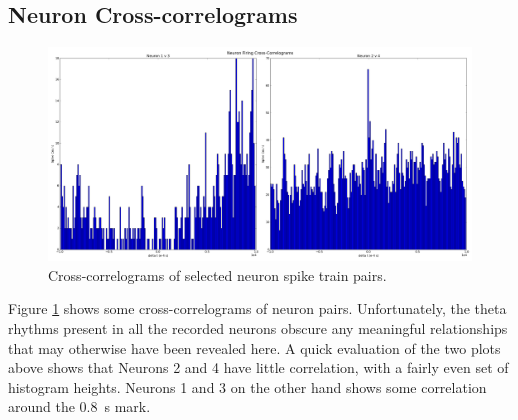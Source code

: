 \documentclass[a4paper, 10pt]{article}
\begin{document}
\subsection*{Neuron Cross-correlograms}
\begin{figure}[H]
  \centering
  \includegraphics[width=1.0\textwidth]{neuron_xcorr_plot.png}
  \caption{Cross-correlograms of selected neuron spike train pairs.}
  \label{fig:xcorr}
\end{figure}

Figure \ref{fig:xcorr} shows some cross-correlograms of neuron
pairs. Unfortunately, the theta rhythms present in all the recorded neurons
obscure any meaningful relationships that may otherwise have been revealed
here. A quick evaluation of the two plots above shows that Neurons 2 and 4 have
little correlation, with a fairly even set of histogram heights. Neurons 1 and 3
on the other hand shows some correlation around the \SI{0.8}{\second} mark.






\end{document}

